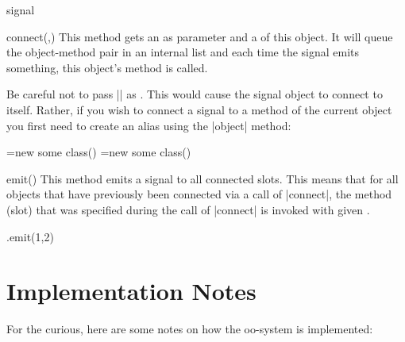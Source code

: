 \begin{ooclass}{signal}
  \begin{method}{connect(,)}
    This method gets an  as parameter and a
     of this object. It will queue the object-method
    pair in an internal list and each time the signal emits something,
    this object's method is called.

    Be careful not to pass |\pgfoothis| as . This
    would cause the signal object to connect to itself. Rather, if you
    wish to connect a signal to a method of the current object you
    first need to create an alias using the |object| method:
\begin{codeexample}
\pgfoonew \objA=new some class()
\pgfoonew \objB=new some class()
\end{codeexample}
  \end{method}

  \begin{method}{emit()}
    This method emits a signal to all connected slots. This means that
    for all objects that have previously been connected via a call of
    |connect|, the method (slot) that was specified during the call of
    |connect| is invoked with given .
\begin{codeexample}
\anothersignal.emit(1,2)
\end{codeexample}
  \end{method}
\end{ooclass}


\section{Implementation Notes}

For the curious, here are some notes on how the oo-system is
implemented:

